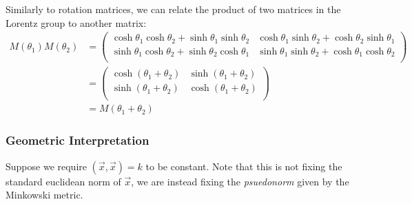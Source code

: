 \documentclass[../main.tex]{subfiles}
\begin{document}
Similarly to rotation matrices, we can relate the product of two matrices in the Lorentz group to another matrix:
\begin{align}
  M(\theta_1)M(\theta_2) &=
  \begin{pmatrix}
  \cosh \theta_1 \cosh \theta_2 + \sinh \theta_1 \sinh \theta_2 & \cosh \theta_1 \sinh \theta_2 + \cosh \theta_2 \sinh \theta_1 \\
  \sinh \theta_1 \cosh \theta_2 + \sinh \theta_2 \cosh \theta_1 & \sinh \theta_1 \sinh \theta_2 + \cosh \theta_1 \cosh \theta_2 \\
  \end{pmatrix} \nonumber \\
  &= \begin{pmatrix}
  \cosh(\theta_1 + \theta_2) & \sinh(\theta_1 + \theta_2) \\
  \sinh(\theta_1 + \theta_2) & \cosh(\theta_1 + \theta_2) \\
  \end{pmatrix} \nonumber \\
  &= M(\theta_1 + \theta_2) \label{lorentzProduct}
\end{align}
\subsubsection{Geometric Interpretation}
Suppose we require $(\vec{x}, \vec{x}) = k$ to be constant.
Note that this is not fixing the standard euclidean norm of $\vec{x}$, we are instead fixing the \textit{psuedonorm} given by the Minkowski metric.
\end{document}
